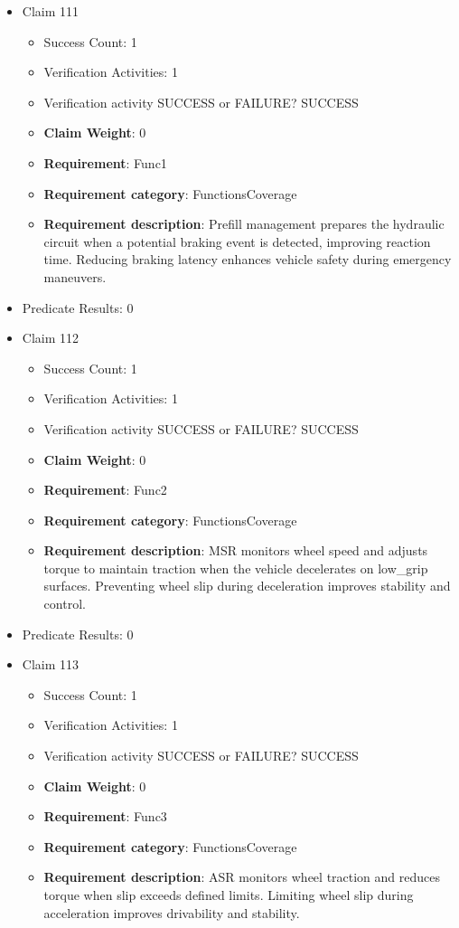 \documentclass{article}
\begin{document}
\begin{itemize}
  				  \item Claim 111
				\begin{itemize}
			    	\item Success Count: 1 
			    	\item Verification Activities: 1
					\item Verification activity SUCCESS or FAILURE? SUCCESS
					\item \textbf{Claim Weight}: 0
						\item \textbf{Requirement}: Func1 
						\item \textbf{Requirement category}: FunctionsCoverage 
						\item \textbf{Requirement description}: Prefill management prepares the hydraulic circuit when a potential braking event is detected, improving reaction time. Reducing braking latency enhances vehicle safety during emergency maneuvers.
					
				\end{itemize}
				
									    
				\item Predicate Results: 0

  				  \item Claim 112
				\begin{itemize}
			    	\item Success Count: 1 
			    	\item Verification Activities: 1
					\item Verification activity SUCCESS or FAILURE? SUCCESS
					\item \textbf{Claim Weight}: 0
						\item \textbf{Requirement}: Func2 
						\item \textbf{Requirement category}: FunctionsCoverage 
						\item \textbf{Requirement description}: MSR monitors wheel speed and adjusts torque to maintain traction when the vehicle decelerates on low_grip surfaces. Preventing wheel slip during deceleration improves stability and control.
					
				\end{itemize}
				
									    
				\item Predicate Results: 0

  				  \item Claim 113
				\begin{itemize}
			    	\item Success Count: 1 
			    	\item Verification Activities: 1
					\item Verification activity SUCCESS or FAILURE? SUCCESS
					\item \textbf{Claim Weight}: 0
						\item \textbf{Requirement}: Func3 
						\item \textbf{Requirement category}: FunctionsCoverage 
						\item \textbf{Requirement description}: ASR monitors wheel traction and reduces torque when slip exceeds defined limits. Limiting wheel slip during acceleration improves drivability and stability.
					

\end{itemize}
\end{itemize}
\end{document}
